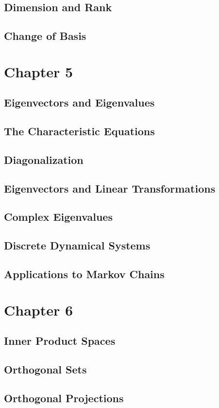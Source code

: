 \documentclass{article}
\begin{document}
\subsection{Dimension and Rank}
\subsection{Change of Basis}
\section{Chapter 5}
\subsection{Eigenvectors and Eigenvalues}
\subsection{The Characteristic Equations}
\subsection{Diagonalization}
\subsection{Eigenvectors and Linear Transformations}
\subsection{Complex Eigenvalues}
\subsection{Discrete Dynamical Systems}
\subsection{Applications to Markov Chains}
\section{Chapter 6}
\subsection{Inner Product Spaces}
\subsection{Orthogonal Sets}
\subsection{Orthogonal Projections}
\end{document}
